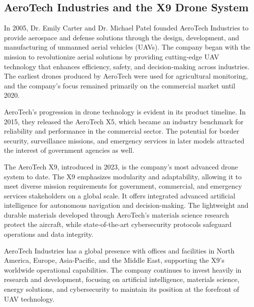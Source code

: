 \subsection{AeroTech Industries and the X9 Drone System}

\noindent In 2005, Dr. Emily Carter and Dr. Michael Patel founded AeroTech Industries to provide aerospace and 
defense solutions through the design, development, and manufacturing of unmanned aerial vehicles (UAVs). The 
company began with the mission to revolutionize aerial solutions by providing cutting-edge UAV technology that 
enhances efficiency, safety, and decision-making across industries. The earliest drones produced by AeroTech 
were used for agricultural monitoring, and the company's focus remained primarily on the commercial market 
until 2020.

\bigskip

\noindent AeroTech's progression in drone technology is evident in its product timeline. In 2015, they 
released the AeroTech X5, which became an industry benchmark for reliability and performance in the commercial 
sector. The potential for border security, surveillance missions, and emergency services in later models 
attracted the interest of government agencies as well.

\bigskip

\noindent The AeroTech X9, introduced in 2023, is the company's most advanced drone system to date.
 The X9 emphasizes modularity and adaptability, allowing it to meet diverse mission requirements for government,
  commercial, and emergency services stakeholders on a global scale. It offers integrated advanced artificial 
  intelligence for autonomous navigation and decision-making. The lightweight and durable materials developed 
  through AeroTech's materials science research protect the aircraft, while state-of-the-art cybersecurity 
  protocols safeguard operations and data integrity.

\bigskip

\noindent AeroTech Industries has a global presence with offices and facilities in North America, Europe, 
Asia-Pacific, and the Middle East, supporting the X9's worldwide operational capabilities. The company 
continues to invest heavily in research and development, focusing on artificial intelligence, materials science, 
energy solutions, and cybersecurity to maintain its position at the forefront of UAV technology.
